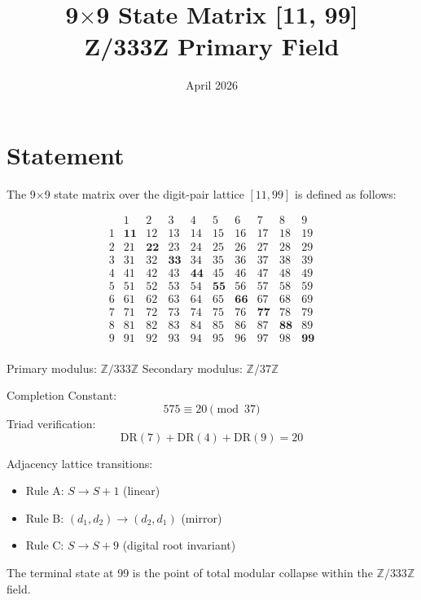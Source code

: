 \documentclass{article}
\title{9$\times$9 State Matrix [11, 99] \\ Z/333Z Primary Field}
\date{April 2026}
\begin{document}
\maketitle

\section{Statement}

The 9$\times$9 state matrix over the digit-pair lattice $[11, 99]$ is defined as follows:

\[
\begin{array}{c|ccccccccc}
 & 1 & 2 & 3 & 4 & 5 & 6 & 7 & 8 & 9 \\
\hline
1 & \mathbf{11} & 12 & 13 & 14 & 15 & 16 & 17 & 18 & 19 \\
2 & 21 & \mathbf{22} & 23 & 24 & 25 & 26 & 27 & 28 & 29 \\
3 & 31 & 32 & \mathbf{33} & 34 & 35 & 36 & 37 & 38 & 39 \\
4 & 41 & 42 & 43 & \mathbf{44} & 45 & 46 & 47 & 48 & 49 \\
5 & 51 & 52 & 53 & 54 & \mathbf{55} & 56 & 57 & 58 & 59 \\
6 & 61 & 62 & 63 & 64 & 65 & \mathbf{66} & 67 & 68 & 69 \\
7 & 71 & 72 & 73 & 74 & 75 & 76 & \mathbf{77} & 78 & 79 \\
8 & 81 & 82 & 83 & 84 & 85 & 86 & 87 & \mathbf{88} & 89 \\
9 & 91 & 92 & 93 & 94 & 95 & 96 & 97 & 98 & \mathbf{99} \\
\end{array}
\]

Primary modulus: $\mathbb{Z}/333\mathbb{Z}$
Secondary modulus: $\mathbb{Z}/37\mathbb{Z}$

Completion Constant:
\[
575 \equiv 20 \pmod{37}
\]
Triad verification:
\[
\mathrm{DR}(7) + \mathrm{DR}(4) + \mathrm{DR}(9) = 20
\]

Adjacency lattice transitions:
\begin{itemize}
\item Rule A: $S \to S + 1$ (linear)
\item Rule B: $(d_1, d_2) \to (d_2, d_1)$ (mirror)
\item Rule C: $S \to S + 9$ (digital root invariant)
\end{itemize}

The terminal state at 99 is the point of total modular collapse within the $\mathbb{Z}/333\mathbb{Z}$ field.
\end{document}
